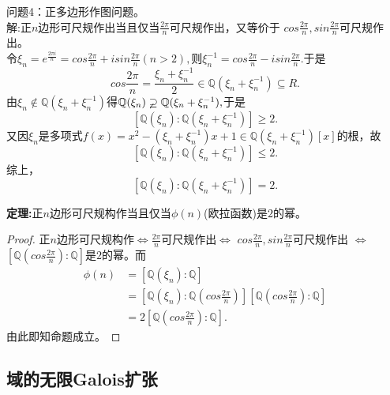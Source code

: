 \documentclass[UTF8]{article}
\begin{document}
问题4：正多边形作图问题。\\
解:正$n$边形可尺规作出当且仅当$\frac{2\pi}{n}$可尺规作出，又等价于
$cos\frac{2\pi}{n},sin\frac{2\pi}{n}$可尺规作出。\\
令$\xi_{n}=e^{\frac{2\pi i}{n}}=cos\frac{2\pi}{n}+isin\frac{2\pi}{n}(n>2),$则$
\xi_{n}^{-1}=cos\frac{2\pi}{n}-isin\frac{2\pi}{n}
.$于是
$$
cos\frac{2\pi}{n}=\frac{\xi_{n}+\xi_{n}^{-1}}{2}\in \mathbb{Q}(\xi_{n}+\xi_{n}^{-1})\subseteq R.
$$
由$\xi_{n}\notin \mathbb{Q}(\xi_{n}+\xi_{n}^{-1})$得$\mathbb{Q}(\xi_{n})\varsupsetneq \mathbb{Q}(\xi_{n}+\xi_{n}^{-1}),$于是
$$
[\mathbb{Q}(\xi_{n}):\mathbb{Q}(\xi_{n}+\xi_{n}^{-1})]\geq 2.
$$
又因$\xi_{n}$是多项式$f(x)=x^{2}-(\xi_{n}+\xi_{n}^{-1})x+1\in\mathbb{Q}(\xi_{n}+\xi_{n}^{-1})[x]$的根，故
$$
[\mathbb{Q}(\xi_{n}):\mathbb{Q}(\xi_{n}+\xi_{n}^{-1})]\leq 2.
$$
综上，
$$
[\mathbb{Q}(\xi_{n}):\mathbb{Q}(\xi_{n}+\xi_{n}^{-1})]=2.
$$

\textbf{定理:}正$n$边形可尺规构作当且仅当$\phi(n)$(欧拉函数)是$2$的幂。
\begin{proof}
	正$n$边形可尺规构作$\Leftrightarrow$$\frac{2\pi}{n}$可尺规作出$\Leftrightarrow$
	$cos\frac{2\pi}{n},sin\frac{2\pi}{n}$可尺规作出
	$\Leftrightarrow$ $[\mathbb{Q}(cos\frac{2\pi}{n}):\mathbb{Q}]$是$2$的幂。而
	\[
	\begin{split}
	\phi(n)&=[\mathbb{Q}(\xi_{n}):\mathbb{Q}]\\
	&=[\mathbb{Q}(\xi_{n}):\mathbb{Q}(cos\frac{2\pi}{n})]
	[\mathbb{Q}(cos\frac{2\pi}{n}):\mathbb{Q}]\\
	&=2	[\mathbb{Q}(cos\frac{2\pi}{n}):\mathbb{Q}].
	\end{split}
	\]
	由此即知命题成立。
\end{proof}
\subsection{域的无限Galois扩张}
\end{document}
